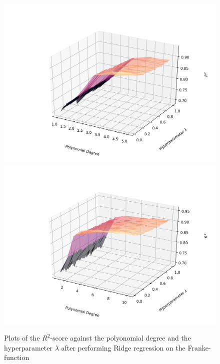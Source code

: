 \documentclass[a4paper,10pt,english]{article}
\begin{document}
\begin{figure}[H]
	\centering 
	\includegraphics[scale=0.47]{../franke_output/part_D_3.png}
	\includegraphics[scale=0.47]{../franke_output/part_D_3_highdeg.png}
	\caption{
		Plots of the $R^2$-score against the polyonomial degree and the hyperparameter $\lambda$ after performing Ridge regression on the Franke-function
	}
	\label{part_d3}
\end{figure}
\end{document}
